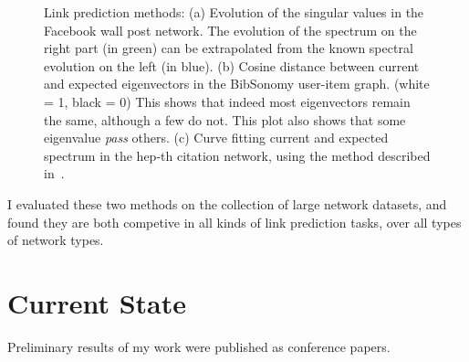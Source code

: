 \documentclass[10pt,twocolumn]{article}
\begin{document}
\begin{figure}[h!]
  \centering
  \caption{
    Link prediction methods:  
    (a) Evolution of the singular values in the Facebook wall post
    network.  The evolution of the spectrum on the right part (in
    green) can be extrapolated from the known spectral evolution on the
    left (in blue).
    (b) Cosine distance between current and expected eigenvectors in the
    BibSonomy user-item graph.  (white = 1, black = 0)  This shows that
    indeed most eigenvectors remain the same, although a few do not.
    This plot also shows that some eigenvalue \emph{pass} others.
    (c) Curve fitting current and expected spectrum in the hep-th
    citation network, using the method described in~\cite{kunegis:spectral-transformation}. 
    }
\end{figure}
I evaluated these two methods on the collection of large network
datasets, and found they are both competive in all kinds of link
prediction tasks, over all types of network types. 

\section{Current State}
Preliminary results of my work were published as conference papers.
\end{document}
